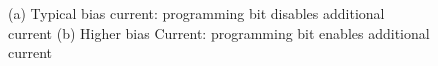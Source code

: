 \begin{figure}[h]
\centering
{}
\qquad
{}
\caption{(a) Typical bias current: programming bit disables additional current (b) Higher bias Current: programming bit enables additional current}
\label{fig:bias_1}
\end{figure}
%
